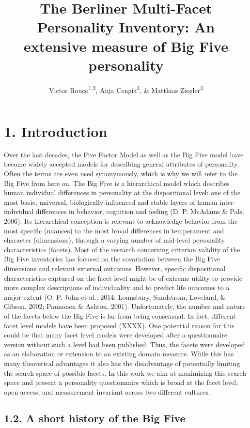 \documentclass[,man,floatsintext]{apa6}
\title{The Berliner Multi-Facet Personality Inventory: An extensive measure of
Big Five personality}
\author{Victor Rouco\textsuperscript{1,2}, Anja Cengia\textsuperscript{3}, \&
Matthias Ziegler\textsuperscript{3}}
\date{}
\affiliation{
\vspace{0.5cm}
\textsuperscript{1} Universitat de Barcelona\\\textsuperscript{2} Institut de Neurociències de Barcelona\\\textsuperscript{3} Humboldt Universität zu Berlin}
\begin{document}
\maketitle

\section{1. Introduction}\label{introduction}

Over the last decades, the Five Factor Model as well as the Big Five
model have become widely accepted models for describing general
attributes of personality. Often the terms are even used synonymously,
which is why we will refer to the Big Five from here on. The Big Five is
a hierarchical model which describes human individual differences in
personality at the dispositional level: one of the most basic,
universal, biologically-influenced and stable layers of human
inter-individual differences in behavior, cognition and feeling (D. P.
McAdams \& Pals, 2006). Its hierarchical conception is relevant to
acknowledge behavior from the most specific (nuances) to the most broad
differences in temperament and character (dimensions), through a varying
number of mid-level personality characteristics (facets). Most of the
research concerning criterion validity of the Big Five inventories has
focused on the covariation between the Big Five dimensions and relevant
external outcomes. However, specific dispositional characteristics
captured on the facet level might be of extreme utility to provide more
complex descriptions of individuality and to predict life outcomes to a
major extent (O. P. John et al., 2014; Lounsbury, Sundstrom, Loveland,
\& Gibson, 2002; Paunonen \& Ashton, 2001). Unfortunately, the number
and nature of the facets below the Big Five is far from being
consensual. In fact, different facet level models have been proposed
(XXXX). One potential reason for this could be that many facet level
models were developed after a questionnaire version without such a level
had been published. Thus, the facets were developed as an elaboration or
extension to an existing domain measure. While this has many theoretical
advantages it also has the disadvantage of potentially limiting the
search space of possible facets. In this work we aim at maximizing this
search space and present a personality questionnaire which is broad at
the facet level, open-access, and measurement invariant across two
different cultures.

\subsection{1.2. A short history of the Big
Five}\label{a-short-history-of-the-big-five}
\end{document}
